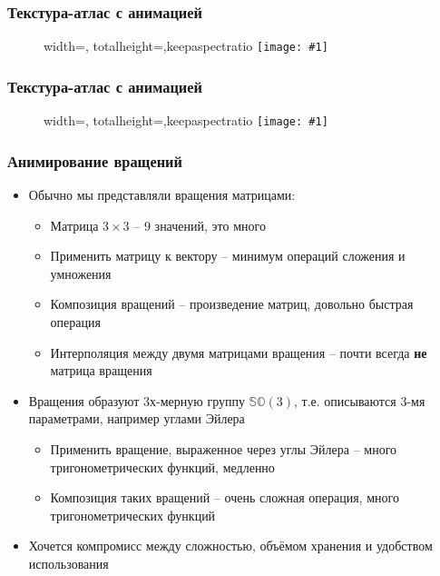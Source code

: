 \documentclass[10pt]{beamer}
\newcommand{\slideimage}[1]{
  \begin{figure}
    \begin{adjustbox}{width=\textwidth, totalheight=\textheight-2\baselineskip-2\baselineskip,keepaspectratio}
      \texttt{[image: \#1]}
    \end{adjustbox}
  \end{figure}
}
\begin{document}
\begin{frame}[fragile]
\frametitle{Текстура-атлас с анимацией}
\slideimage{atlas1.jpg}
\end{frame}

\begin{frame}[fragile]
\frametitle{Текстура-атлас с анимацией}
\slideimage{atlas2.jpg}
\end{frame}

\begin{frame}[fragile]
\frametitle{Анимирование вращений}
\begin{itemize}
\item Обычно мы представляли вращения матрицами:
\begin{itemize}
\item Матрица \begin{math}3\times 3\end{math} -- 9 значений, это много
\pause
\item Применить матрицу к вектору -- минимум операций сложения и умножения
\pause
\item Композиция вращений -- произведение матриц, довольно быстрая операция
\pause
\item Интерполяция между двумя матрицами вращения -- почти всегда \textbf{не} матрица вращения
\end{itemize}
\pause
\item Вращения образуют 3х-мерную группу \begin{math}\mathbb{SO}(3)\end{math}, т.е. описываются 3-мя параметрами, например углами Эйлера
\pause
\begin{itemize}
\item Применить вращение, выраженное через углы Эйлера -- много тригонометрических функций, медленно
\pause
\item Композиция таких вращений -- очень сложная операция, много тригонометрических функций
\end{itemize}
\pause
\item Хочется компромисс между сложностью, объёмом хранения и удобством использования
\end{itemize}
\end{frame}
\end{document}
